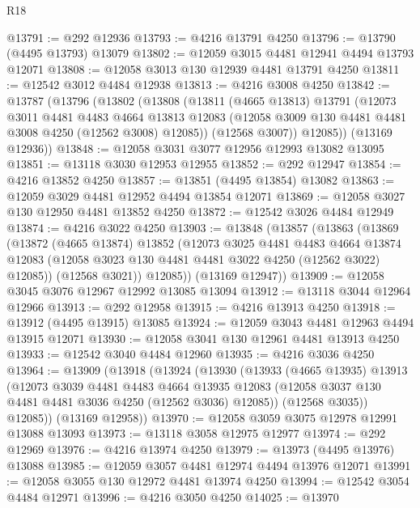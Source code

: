 \begin{lexlean}{R18}
\begin{coremodule}
@13791 := @292 @12936
@13793 := @4216 @13791 @4250
@13796 := @13790 (@4495 @13793) @13079
@13802 := @12059 @3015 @4481 @12941 @4494 @13793 @12071
@13808 := @12058 @3013 @130 @12939 @4481 @13791 @4250
@13811 := @12542 @3012 @4484 @12938
@13813 := @4216 @3008 @4250
@13842 := @13787
    (@13796
      (@13802
        (@13808
          (@13811
            (@4665 @13813)
            @13791
            (@12073
              @3011
              @4481
              @4483
              @4664
              @13813
              @12083
              (@12058 @3009 @130 @4481 @4481 @3008 @4250 (@12562 @3008) @12085))
            (@12568 @3007))
          @12085))
      (@13169 @12936))
@13848 := @12058 @3031 @3077 @12956 @12993 @13082 @13095
@13851 := @13118 @3030 @12953 @12955
@13852 := @292 @12947
@13854 := @4216 @13852 @4250
@13857 := @13851 (@4495 @13854) @13082
@13863 := @12059 @3029 @4481 @12952 @4494 @13854 @12071
@13869 := @12058 @3027 @130 @12950 @4481 @13852 @4250
@13872 := @12542 @3026 @4484 @12949
@13874 := @4216 @3022 @4250
@13903 := @13848
    (@13857
      (@13863
        (@13869
          (@13872
            (@4665 @13874)
            @13852
            (@12073
              @3025
              @4481
              @4483
              @4664
              @13874
              @12083
              (@12058 @3023 @130 @4481 @4481 @3022 @4250 (@12562 @3022) @12085))
            (@12568 @3021))
          @12085))
      (@13169 @12947))
@13909 := @12058 @3045 @3076 @12967 @12992 @13085 @13094
@13912 := @13118 @3044 @12964 @12966
@13913 := @292 @12958
@13915 := @4216 @13913 @4250
@13918 := @13912 (@4495 @13915) @13085
@13924 := @12059 @3043 @4481 @12963 @4494 @13915 @12071
@13930 := @12058 @3041 @130 @12961 @4481 @13913 @4250
@13933 := @12542 @3040 @4484 @12960
@13935 := @4216 @3036 @4250
@13964 := @13909
    (@13918
      (@13924
        (@13930
          (@13933
            (@4665 @13935)
            @13913
            (@12073
              @3039
              @4481
              @4483
              @4664
              @13935
              @12083
              (@12058 @3037 @130 @4481 @4481 @3036 @4250 (@12562 @3036) @12085))
            (@12568 @3035))
          @12085))
      (@13169 @12958))
@13970 := @12058 @3059 @3075 @12978 @12991 @13088 @13093
@13973 := @13118 @3058 @12975 @12977
@13974 := @292 @12969
@13976 := @4216 @13974 @4250
@13979 := @13973 (@4495 @13976) @13088
@13985 := @12059 @3057 @4481 @12974 @4494 @13976 @12071
@13991 := @12058 @3055 @130 @12972 @4481 @13974 @4250
@13994 := @12542 @3054 @4484 @12971
@13996 := @4216 @3050 @4250
@14025 := @13970

\end{coremodule}
\end{lexlean}
